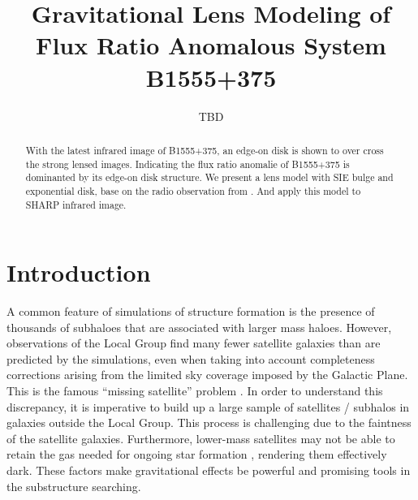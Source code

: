 \documentclass[manuscript]{emulateapj}
\begin{document}
\title{Gravitational Lens Modeling of Flux Ratio Anomalous System B1555+375}
\author{TBD}

\begin{abstract}
With the latest infrared image of B1555+375, an edge-on disk is shown to over cross the strong lensed images. Indicating the flux ratio anomalie of B1555+375 is dominanted by its edge-on disk structure. We present a lens model with SIE bulge and exponential disk, base on the radio observation from \citet{Marlow}. And apply this model to SHARP infrared image.

\end{abstract}


\section{Introduction}

A common feature of simulations of structure formation is the presence
of thousands of subhaloes that are associated with larger mass haloes.
However, observations of the Local Group find many fewer satellite
galaxies than are predicted by the simulations, even when taking into
account completeness corrections arising from the limited sky coverage
imposed by the Galactic Plane.  This is the famous ``missing
satellite'' problem \citep{Klypin1999, Moore1999, S07}.  In order to understand
this discrepancy, it is imperative to build up a large sample of satellites /
subhalos in galaxies outside the Local Group.  This process is challenging
due to the faintness of the satellite galaxies.  Furthermore, lower-mass
satellites may not be able to retain the gas needed for ongoing star
formation \citep[e.g.,][]{P11}, rendering them effectively dark.
These
factors make gravitational effects be powerful and promising tools in
the substructure searching.
\end{document}

